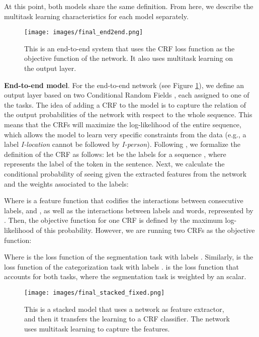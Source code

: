 \documentclass[11pt,a4paper]{article}
\begin{document}
At this point, both models share the same definition. From here, we describe the multitask learning characteristics for each model separately. 

\begin{figure}
\centering
\texttt{[image: images/final\_end2end.png]}
\caption{ This is an end-to-end system that uses the CRF loss function as the objective function of the network. It also uses multitask learning on the output layer.}
\label{f:system1}
\end{figure}

\noindent \textbf{End-to-end model}. For the end-to-end network (see Figure \ref{f:system1}), we define an output layer based on two Conditional Random Fields \citep{Lafferty:2001:CRF:645530.655813}, each assigned to one of the tasks. The idea of adding a CRF to the model is to capture the relation of the output probabilities of the network with respect to the whole sequence. This means that the CRFs will maximize the log-likelihood of the entire sequence, which allows the model to learn very specific constraints from the data (e.g., a label \textit{I-location} cannot be followed by \textit{I-person}). Following \citet{MaAndHovy:16}, we formalize the definition of the CRF as follows: let  be the labels for a sequence , where  represents the  label of the  token in the sentence. Next, we calculate the conditional probability of seeing  given the extracted features  from the network and the weights  associated to the labels:


Where   is a feature function that codifies the interactions between consecutive labels,  and , as well as the interactions between labels and words, represented by . Then, the objective function for one CRF is defined by the maximum log-likelihood of this probability. However, we are running two CRFs as the objective function:


Where  is the loss function of the segmentation task with labels . Similarly,  is the loss function of the categorization task with labels .  is the loss function that accounts for both tasks, where the segmentation task is weighted by an  scalar.

\begin{figure}
\centering
\texttt{[image: images/final\_stacked\_fixed.png]}
\caption{ This is a stacked model that uses a network as feature extractor, and then it transfers the learning to a CRF classifier. The network uses multitask learning to capture the features. }
\label{f:system2}
\end{figure}
\end{document}
